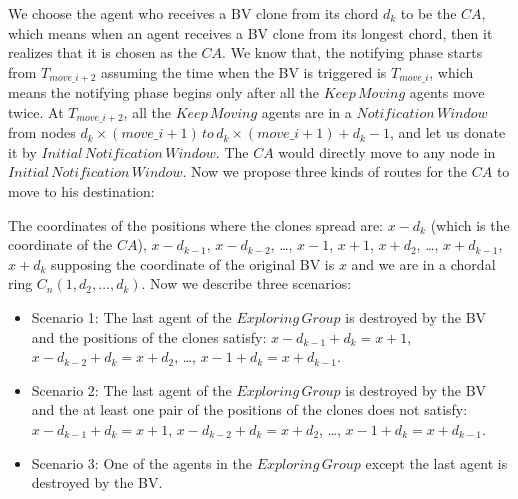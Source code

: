 \documentclass[conference]{IEEEtran}
\begin{document}

We choose the agent who receives a BV clone from its chord $d_k$ to be the $CA$, which means when an agent receives a BV clone from its longest chord, then it realizes that it is chosen as the $CA$. We know that, the notifying phase starts from $T_{move\_{i+2}}$ assuming the time when the BV is triggered is $T_{move\_i}$, which means the notifying phase begins only after all the $Keep\,Moving$ agents move twice. At $T_{move\_{i+2}}$, all the $Keep\,Moving$ agents are in a $Notification\,Window$ from nodes $d_k\times(move\_{i}+1)\,to\,d_k\times(move\_{i}+1) + d_{k}-1$, and let us donate it by $Initial\,Notification\,Window$. The $CA$ would directly move to any node in $Initial\,Notification\,Window$. Now we propose three kinds of routes for the $CA$ to move to his destination:

The coordinates of the positions where the clones spread are: $x-d_k$ (which is the coordinate of the $CA$), $x-d_{k-1}$, $x-d_{k-2}$, \ldots, $x-1$, $x+1$, $x+d_2$, \ldots, $x+d_{k-1}$, $x+d_{k}$ supposing the coordinate of the original BV is $x$ and we are in a chordal ring $C_n(1, d_2,\ldots, d_k)$.
 Now we describe three scenarios:
\begin{itemize}
\item Scenario 1: The last agent of the $Exploring\,Group$ is destroyed by the BV and the positions of the clones satisfy: $x-d_{k-1}+d_{k}=x+1$, $x-d_{k-2}+d_{k}=x+d_2$, \ldots, $x-1+d_{k}=x+d_{k-1}$. 
\item Scenario 2: The last agent of the $Exploring\,Group$ is destroyed by the BV and the at least one pair of the positions of the clones does not satisfy: $x-d_{k-1}+d_{k}=x+1$, $x-d_{k-2}+d_{k}=x+d_2$, \ldots, $x-1+d_{k}=x+d_{k-1}$. 
\item Scenario 3: One of the agents in the $Exploring\,Group$ except the last agent is destroyed by the BV.
\end{itemize}
\end{document}
